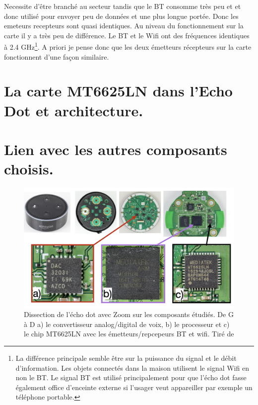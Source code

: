 \documentclass[12pt,svgnames]{article}
\begin{document}
   
Necessite d'être branché au secteur tandis que le BT consomme très peu et et donc utilisé pour envoyer peu de données et une plus longue portée.
Donc les emeteurs recepteurs sont quasi identiques. Au niveau du fonctionnement sur la carte il y a très peu de différence.
Le BT et le Wifi ont des fréquences identiques à 2.4 GHz\footnote{La différence principale semble être sur la puissance du signal et le débit d'information. Les objets connectés dans la maison utilisent le signal Wifi en non le BT. Le signal BT est utilisé principalement pour que l'écho dot fasse également office d'enceinte externe si l'usager veut appareiller par exemple un téléphone portable.}. A priori je pense donc que les deux émetteurs récepteurs sur la carte fonctionnent d'une façon similaire.

\section{La carte MT6625LN dans l'Echo Dot et architecture.}


\section{Lien avec les autres composants choisis.}

\begin{figure}[h!]
\begin{center}
\includegraphics[width=\textwidth]{fig/echo-dot-inside}
\caption{Dissection de l'écho dot avec Zoom sur les composants étudiés. De G à D a) le convertisseur analog/digital de voix, b) le processeur et c) le chip MT6625LN avec les émetteurs/repcepeurs BT et wifi. Tiré de \cite{wikimedia-echo-dot}}
\label{fig:gain-var}
\end{center}
\end{figure}
\end{document}
